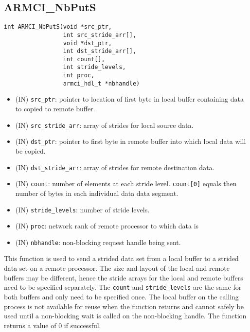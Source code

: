 \documentclass[12pt]{article}
\begin{document}
\subsection{ARMCI\_NbPutS}
\begin{verbatim}
int ARMCI_NbPutS(void *src_ptr,
                 int src_stride_arr[],
                 void *dst_ptr,
                 int dst_stride_arr[],
                 int count[],
                 int stride_levels,
                 int proc,
                 armci_hdl_t *nbhandle)
\end{verbatim}
\begin{itemize}
\item (IN) \texttt{src\_ptr}: pointer to location of first byte in local buffer
containing data to copied to remote buffer.
\item (IN) \texttt{src\_stride\_arr}: array of strides for local source data.
\item (IN) \texttt{dst\_ptr}: pointer to first byte in remote buffer into which local
data will be copied.
\item (IN) \texttt{dst\_stride\_arr}: array of strides for remote destination data.
\item (IN) \texttt{count}: number of elements at each stride level.
\texttt{count[0]} equals then number of bytes in each individual data data segment.
\item (IN) \texttt{stride\_levels}: number of stride levels.
\item (IN) \texttt{proc}: network rank of remote processor to which data is
\item (IN) \texttt{nbhandle}: non-blocking request handle
being sent.
\end{itemize}
This function is used to send a strided data set from a local buffer to a
strided data set on a remote processor. The size and layout of the local and
remote buffers may be different, hence the stride arrays for the local and
remote buffers need to be specified separately. The \texttt{count} and
\texttt{stride\_levels} are the same for both buffers and only need to be
specified once. The local buffer on the calling process is not available for reuse
when the function returns and cannot safely be used until a non-blocking wait is
called on the non-blocking handle. The function returns a value of 0 if successful.
\end{document}
